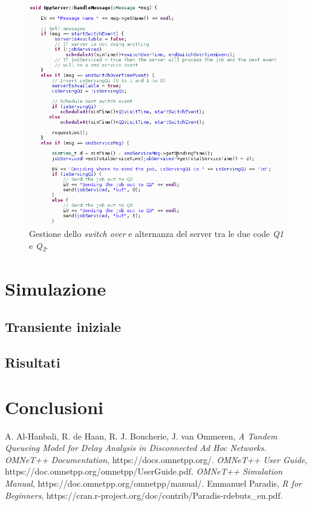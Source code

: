\documentclass[a4paper,11pt]{article}
\begin{document}
\begin{figure}[h!]
    \centering
    \includegraphics[width=\linewidth]{images/handle-message-oppserver.png}
    \caption{Gestione dello \textit{switch over} e alternanza del server tra le due code \textit{Q\textit{1}} e \textit{Q\textsubscript{2}}.}
    \label{fig:1}
\end{figure}

\section{Simulazione}



\subsection{Transiente iniziale}
\subsection{Risultati}

\section{Conclusioni}

\begin{thebibliography}{90}

 A. Al-Hanbali, R. de Haan, R. J. Boucherie, J. van Ommeren, \textit{A Tandem Queueing Model for Delay Analysis in Disconnected Ad Hoc Networks.}
 \textit{OMNeT++ Documentation}, https://docs.omnetpp.org/.
 \textit{OMNeT++ User Guide}, https://doc.omnetpp.org/omnetpp/UserGuide.pdf.
 \textit{OMNeT++ Simulation Manual}, https://doc.omnetpp.org/omnetpp/manual/.
 Emmanuel Paradis, \textit{R for Beginners}, https://cran.r-project.org/doc/contrib/Paradis-rdebuts\_en.pdf.
\end{thebibliography}
\end{document}
